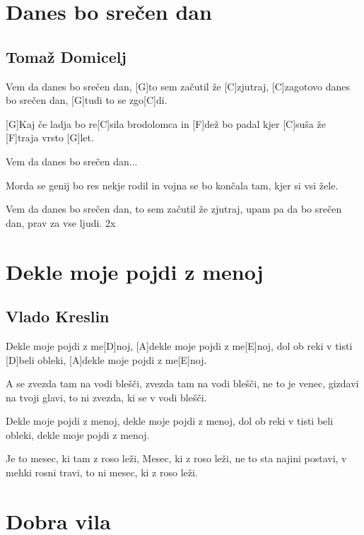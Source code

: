 \documentclass[a4paper,12pt]{article}
\begin{document}
\begin{multicols}{2}
\section{Danes bo srečen dan}
\subsection*{Tomaž Domicelj}
\begin{guitar}
[C]Vem da danes bo srečen dan, 
[G]to sem začutil že [C]zjutraj,              
[C]zagotovo danes bo srečen dan, 
[G]tudi to se zgo[C]di.


[G]Kaj če ladja bo re[C]sila brodolomca
in [F]dež bo padal kjer [C]suša že [F]traja vrsto [G]let.


Vem da danes bo srečen dan...


Morda se genij bo res nekje rodil 
in vojna se bo končala tam, kjer si vsi žele. 


Vem da danes bo srečen dan, 
to sem začutil že zjutraj,
upam pa da bo srečen dan, 
prav za vse ljudi. 2x

\end{guitar}
\section{Dekle moje pojdi z menoj}
\subsection*{Vlado Kreslin}
\begin{guitar}
[E]Dekle moje pojdi z me[D]noj,
[A]dekle moje pojdi z me[E]noj,
dol ob reki v tisti [D]beli obleki,
[A]dekle moje pojdi z me[E]noj.



A se zvezda tam na vodi blešči,
zvezda tam na vodi blešči,
ne to je venec, gizdavi na tvoji glavi,
to ni zvezda, ki se v vodi blešči.



Dekle moje pojdi z menoj,
dekle moje pojdi z menoj,
dol ob reki v tisti beli obleki,
dekle moje pojdi z menoj.



Je to mesec, ki tam z roso leži,
Mesec, ki z roso leži,
ne to sta najini postavi,
v mehki rosni travi,
to ni mesec, ki z roso leži.

\end{guitar}
\section{Dobra vila}

\end{multicols}
\end{document}
